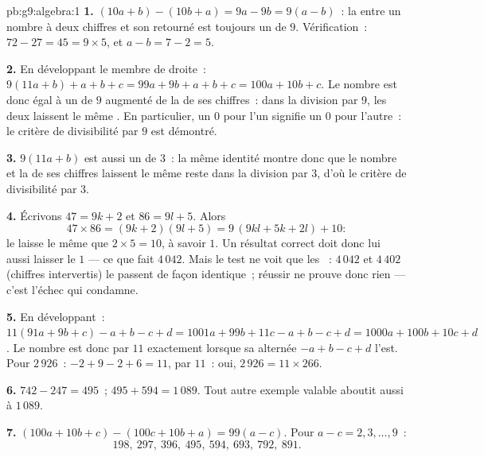 \begin{solution}{pb:g9:algebra:1}
\textbf{1.} $(10a + b) - (10b + a) = 9a - 9b = 9(a - b)$~: la
 entre un nombre à deux chiffres et son retourné est
toujours un  de $9$. Vérification~:
$72 - 27 = 45 = 9 \times 5$, et $a - b = 7 - 2 = 5$.

\textbf{2.} En développant le membre de droite~:
$9(11a + b) + a + b + c = 99a + 9b + a + b + c
= 100a + 10b + c$. Le nombre est donc égal à un  de $9$
augmenté de la  de ses chiffres~: dans la division par $9$, les
deux laissent le même . En particulier, un  $0$ pour l'un
signifie un  $0$ pour l'autre~: le critère de divisibilité par
$9$ est démontré.

\textbf{3.} $9(11a + b)$ est aussi un  de $3$~: la même
identité montre donc que le nombre et la  de ses chiffres
laissent le même reste dans la division par $3$, d'où le critère de
divisibilité par $3$.

\textbf{4.} Écrivons $47 = 9k + 2$ et $86 = 9l + 5$. Alors
\[
47 \times 86 = (9k + 2)(9l + 5)
= 9\,(9kl + 5k + 2l) + 10 :
\]
le  laisse le même  que $2 \times 5 = 10$, à savoir
$1$. Un résultat correct doit donc lui aussi laisser le  $1$
--- ce que fait $4\,042$. Mais le test ne voit que les ~:
$4\,042$ et $4\,402$ (chiffres intervertis) le passent de façon
identique~; réussir ne prouve donc rien --- c'est l'échec qui
condamne.

\textbf{5.} En développant~: $11(91a + 9b + c) - a + b - c + d
= 1001a + 99b + 11c - a + b - c + d
= 1000a + 100b + 10c + d$. Le nombre est donc  par $11$
exactement lorsque sa  alternée $-a + b - c + d$ l'est. Pour
$2\,926$~: $-2 + 9 - 2 + 6 = 11$,  par $11$~: oui,
$2\,926 = 11 \times 266$.

\textbf{6.} $742 - 247 = 495$~; $495 + 594 = 1\,089$. Tout autre
exemple valable aboutit aussi à $1\,089$.

\textbf{7.} $(100a + 10b + c) - (100c + 10b + a) = 99(a - c)$. Pour
$a - c = 2, 3, \dots, 9$~:
\[
198,\ 297,\ 396,\ 495,\ 594,\ 693,\ 792,\ 891 .
\]


\end{solution}
